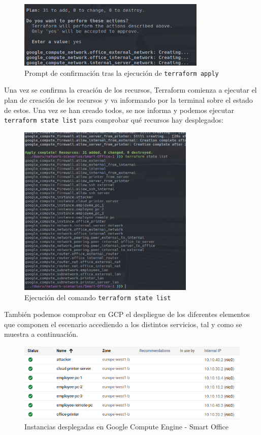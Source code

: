   \begin{figure}[h]
  \centering
  \includegraphics[width=0.8\textwidth]{../imgs/desarrollo/resultados/so/prompt.png}
  \caption{Prompt de confirmación tras la ejecución de \texttt{terraform apply}}
  \end{figure}

  Una vez se confirma la creación de los recursos, Terraform comienza a ejecutar el plan de creación de los recursos y va informando por la terminal sobre el estado de estos. Una vez se han creado todos, se nos informa y podemos ejecutar \texttt{terraform state list} para comprobar qué recursos hay desplegados: 

  \begin{figure}[h]
  \centering
  \includegraphics[width=0.75\textwidth]{../imgs/desarrollo/resultados/so/state.png}
  \caption{Ejecución del comando \texttt{terraform state list}}
  \end{figure}

  También podemos comprobar en GCP el despliegue de los diferentes elementos que componen el escenario accediendo a los distintos servicios, tal y como se muestra a continuación.

  \begin{figure}[h]
  \centering
  \includegraphics[width=\textwidth]{../imgs/desarrollo/resultados/so/instances.png}
  \caption{Instancias desplegadas en Google Compute Engine - Smart Office}
  \end{figure}

